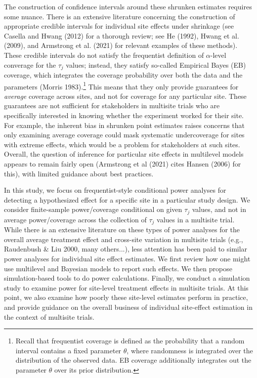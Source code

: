\documentclass[]{article}
\begin{document}
The construction of confidence intervals around these shrunken estimates requires some nuance.
There is an extensive literature concerning the construction of appropriate credible intervals for individual site effects under shrinkage (see Casella and Hwang (2012) for a thorough review; see He (1992), Hwang et al. (2009), and Armstrong et al. (2021) for relevant examples of these methods).
These credible intervals do not satisfy the frequentist definition of $\alpha$-level converage for the $\tau_j$ values; instead, they satisfy so-called Empirical Bayes (EB) coverage, which integrates the coverage probability over both the data and the parameters (Morris 1983).\footnote{Recall that frequentist coverage is defined as the probability that a random interval contains a fixed parameter $\theta$, where randomness is integrated over the distribution of the observed data.
	EB coverage additionally integrates out the parameter $\theta$ over its prior distribution.}
This means that they only provide guarantees for \textit{average} coverage across sites, and not for coverage for any particular site.
These guarantees are not sufficient for stakeholders in multisite trials who are specifically interested in knowing whether the experiment worked for their site.
For example, the inherent bias in shrunken point estimates raises concerns that only examining average coverage could mask systematic undercoverage for sites with extreme effects, which would be a problem for stakeholders at such sites.
Overall, the question of inference for particular site effects in multilevel models appears to remain fairly open (Armstrong et al (2021) cites Hansen (2006) for this), with limited guidance about best practices.

In this study, we focus on frequentist-style conditional power analyses for detecting a hypothesized effect for a specific site in a particular study design.
We consider finite-sample power/coverage conditional on given $\tau_j$ values, and not in average power/coverage across the collection of $\tau_j$ values in a multisite trial.
While there is an extensive literature on these types of power analyses for the overall average treatment effect and cross-site variation in multisite trials (e.g., Raudenbush \& Liu 2000, many others...), less attention has been paid to similar power analyses for individual site effect estimates.
We first review how one might use multilevel and Bayesian models to report such effects.
We then propose simulation-based tools to do power calculations.
Finally, we conduct a simulation study to examine power for site-level treatment effects in multisite trials.
At this point, we also examine how poorly these site-level estimates perform in practice, and provide guidance on the overall business of individual site-effect estimation in the context of multisite trials.
\end{document}
